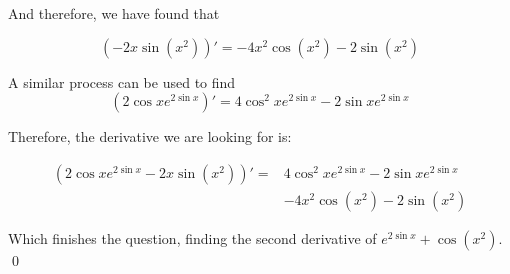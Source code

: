 \begin{solution}
    And therefore, we have found that 

    \[ (-2x \sin(x^2))' = -4x^2 \cos (x^2) -2  \sin (x^2)\]

    A similar process can be used to find 
    \[(2\cos x  e^{2\sin x})' = 4\cos^2 x e^{2\sin x} - 2 \sin x e^{2\sin x}\]

    Therefore, the derivative we are looking for is:
    
    \begin{align*}
    (2\cos x  e^{2\sin x} -2x \sin(x^2))' =& 4\cos^2 x e^{2\sin x} - 2 \sin x e^{2\sin x} \\
     &-4x^2 \cos (x^2) -2  \sin (x^2)
    \end{align*}

    Which finishes the question, finding the second derivative of $e^{2\sin x} + \cos (x^2)$.
    \qed
\end{solution}







